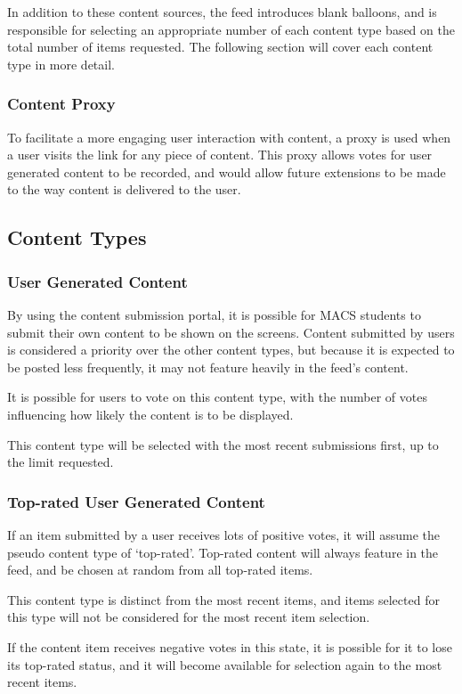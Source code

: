In addition to these content sources, the feed introduces blank balloons, and is responsible for selecting an appropriate number of each content type based on the total number of items requested. The following section will cover each content type in more detail.

\subsubsection{Content Proxy}
To facilitate a more engaging user interaction with content, a proxy is used when a user visits the link for any piece of content. This proxy allows votes for user generated content to be recorded, and would allow future extensions to be made to the way content is delivered to the user.

\subsection{Content Types}

\subsubsection{User Generated Content}
By using the content submission portal, it is possible for MACS students to submit their own content to be shown on the screens. Content submitted by users is considered a priority over the other content types, but because it is expected to be posted less frequently, it may not feature heavily in the feed's content.

It is possible for users to vote on this content type, with the number of votes influencing how likely the content is to be displayed.

This content type will be selected with the most recent submissions first, up to the limit requested.

\subsubsection{Top-rated User Generated Content}
If an item submitted by a user receives lots of positive votes, it will assume the pseudo content type of `top-rated'. Top-rated content will always feature in the feed, and be chosen at random from all top-rated items.

This content type is distinct from the most recent items, and items selected for this type will not be considered for the most recent item selection.

If the content item receives negative votes in this state, it is possible for it to lose its top-rated status, and it will become available for selection again to the most recent items.

